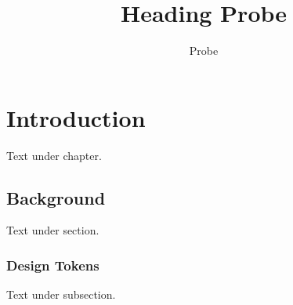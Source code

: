 \documentclass{semio}
\title{Heading Probe}
\author{Probe}
\begin{document}
\maketitle
\chapter{Introduction}
Text under chapter.
\section{Background}
Text under section.
\subsection{Design Tokens}
Text under subsection.
\end{document}
